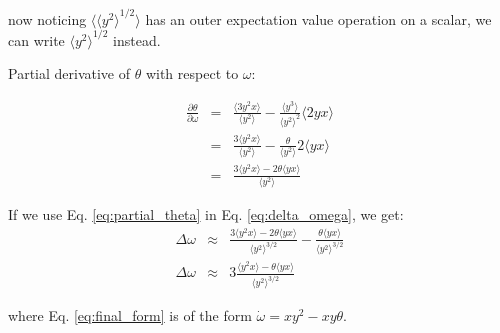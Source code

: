 now noticing $\langle {\langle y^2 \rangle}^{1/2} \rangle$ has an outer expectation value operation on a scalar, we can write $ {\langle y^2 \rangle}^{1/2} $ instead.

Partial derivative of $\theta$ with respect to $\omega$:

\begin{eqnarray}
\frac{\partial \theta}{\partial \omega} &=& \frac{\langle 3y^2 x\rangle}{\langle y^2 \rangle}  - \frac{\langle y^3\rangle}{\langle y^2\rangle^2} \langle 2yx\rangle \\
 &=& \frac{3\langle y^2 x\rangle}{\langle y^2 \rangle}  - \frac{\theta}{\langle y^2\rangle} 2\langle yx\rangle \\
 &=& \frac{3\langle y^2 x\rangle-2\theta\langle yx\rangle}{\langle y^2 \rangle}  \label{eq:partial_theta}
\end{eqnarray}

If we use Eq. \ref{eq:partial_theta} in Eq. \ref{eq:delta_omega}, we get: 
\begin{eqnarray}
\Delta \omega&\approx&  \frac{3\langle y^2 x\rangle-2\theta\langle yx\rangle}{\langle y^2 \rangle^{3/2}}   -  \frac{\theta \langle y x \rangle}  {\langle y^2 \rangle^{3/2}} \\
\Delta \omega&\approx&  3\frac{\langle y^2 x\rangle-\theta\langle yx\rangle}{\langle y^2 \rangle^{3/2}}  \label{eq:final_form} 
\end{eqnarray}

where Eq. \ref{eq:final_form} is of the form $\dot\omega =  xy^2 - xy\theta$.
